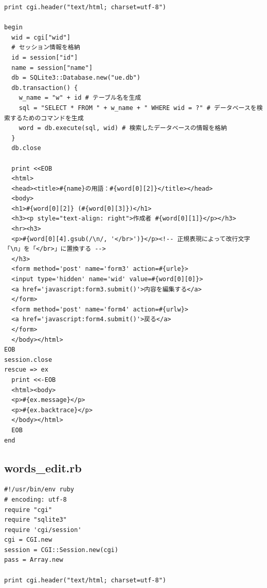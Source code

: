 \documentclass[12pt,a4paper]{jarticle}
\begin{document}
\begin{ttfamily}
\begin{oframed}
\begin{verbatim}
print cgi.header("text/html; charset=utf-8")

begin
  wid = cgi["wid"]
  # セッション情報を格納
  id = session["id"]
  name = session["name"]
  db = SQLite3::Database.new("ue.db")
  db.transaction() {
    w_name = "w" + id # テーブル名を生成
    sql = "SELECT * FROM " + w_name + " WHERE wid = ?" # データベースを検索するためのコマンドを生成
    word = db.execute(sql, wid) # 検索したデータベースの情報を格納
  }
  db.close

  print <<EOB
  <html>
  <head><title>#{name}の用語：#{word[0][2]}</title></head>
  <body>
  <h1>#{word[0][2]} (#{word[0][3]})</h1>
  <h3><p style="text-align: right">作成者 #{word[0][1]}</p></h3>
  <hr><h3>
  <p>#{word[0][4].gsub(/\n/, '</br>')}</p><!-- 正規表現によって改行文字「\n」を「</br>」に置換する -->
  </h3>
  <form method='post' name='form3' action=#{urle}>
  <input type='hidden' name='wid' value=#{word[0][0]}>
  <a href='javascript:form3.submit()'>内容を編集する</a>
  </form>
  <form method='post' name='form4' action=#{urlw}>
  <a href='javascript:form4.submit()'>戻る</a>
  </form>
  </body></html>
EOB
session.close
rescue => ex
  print <<-EOB
  <html><body>
  <p>#{ex.message}</p>
  <p>#{ex.backtrace}</p>
  </body></html>
  EOB
end
 \end{verbatim}
\end{oframed}

\subsection*{words\_edit.rb}
\begin{oframed}
 \fontsize{8pt}{8pt}\selectfont
 \begin{verbatim}
#!/usr/bin/env ruby
# encoding: utf-8
require "cgi"
require "sqlite3"
require 'cgi/session'
cgi = CGI.new
session = CGI::Session.new(cgi)
pass = Array.new

print cgi.header("text/html; charset=utf-8")


\end{verbatim}
\end{oframed}
\end{ttfamily}
\end{document}
